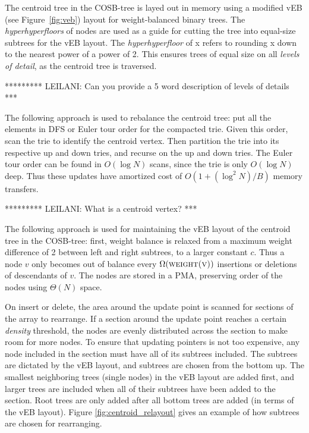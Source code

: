 \documentclass[preprint]{style}
\begin{document}
The centroid tree in the COSB-tree is layed out in memory using a modified vEB
(see Figure~\ref{fig:veb}) layout for weight-balanced binary trees. The
\emph{hyperhyperfloors} of nodes are used as a guide for cutting the tree into
equal-size subtrees for the vEB layout. The \emph{hyperhyperfloor} of x refers
to rounding x down to the nearest power of a power of 2. This ensures trees
of equal size on all \emph{levels of detail}, as the centroid tree is traversed.

********* LEILANI: Can you provide a 5 word description of levels of details ***


The following approach is used to rebalance the centroid tree: put all the
elements in DFS or Euler tour order for the compacted trie. Given this order,
scan the trie to identify the centroid vertex. Then partition the trie into its
respective up and down tries, and recurse on the up and down tries. The Euler
tour order can be found in $O(\log{N})$ scans, since the trie is only
$O(\log{N})$ deep. Thus these updates have amortized cost of
$O(1+(\log^{2}{N})/B)$ memory transfers.

********* LEILANI: What is a centroid vertex? ***

The following approach is used for maintaining the vEB layout of the centroid
tree in the COSB-tree: first, weight balance is relaxed from a maximum weight
difference of 2 between left and right subtrees, to a larger constant $c$. Thus
a node $v$ only becomes out of balance every $\Omega(\textsc{weight(v)})$
insertions or deletions of descendants of $v$. The nodes are stored in a PMA,
preserving order of the nodes using $\Theta(N)$ space.

On insert or delete, the area around the update point is scanned for sections
of the array to rearrange. If a section around the update point reaches a
certain \textit{density} threshold, the nodes are evenly distributed across the
section to make room for more nodes. To ensure that updating pointers is not too
expensive, any node included in the section must have all of its subtrees
included. The subtrees are dictated by the vEB layout, and subtrees are chosen
from the bottom up. The smallest neighboring trees (single nodes) in the vEB
layout are added first, and larger trees are included when all of their
subtrees have been added to the section. Root trees are only added after all
bottom trees are added (in terms of the vEB layout). Figure
\ref{fig:centroid_relayout} gives an example of how subtrees are chosen for
rearranging.
\end{document}
